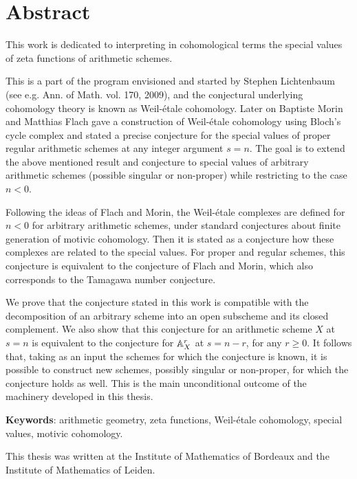 \chapter*{Abstract}

This work is dedicated to interpreting in cohomological terms the special values
of zeta functions of arithmetic schemes.

This is a part of the program envisioned and started by Stephen Lichtenbaum
(see e.g. Ann. of Math. vol. 170, 2009), and the conjectural underlying
cohomology theory is known as Weil-étale cohomology.  Later on Baptiste Morin
and Matthias Flach gave a construction of Weil-étale cohomology using Bloch's
cycle complex and stated a precise conjecture for the special values of proper
regular arithmetic schemes at any integer argument $s=n$. The goal is to extend
the above mentioned result and conjecture to special values of arbitrary
arithmetic schemes (possible singular or non-proper) while restricting to the
case $n<0$.

Following the ideas of Flach and Morin, the Weil-étale complexes are defined for
$n < 0$ for arbitrary arithmetic schemes, under standard conjectures about
finite generation of motivic cohomology. Then it is stated as a conjecture how
these complexes are related to the special values. For proper and regular
schemes, this conjecture is equivalent to the conjecture of Flach and Morin,
which also corresponds to the Tamagawa number conjecture.

We prove that the conjecture stated in this work is compatible with the
decomposition of an arbitrary scheme into an open subscheme and its closed
complement. We also show that this conjecture for an arithmetic scheme $X$ at
$s=n$ is equivalent to the conjecture for $\AA^r_X$ at $s=n-r$, for any
$r\geq 0$. It follows that, taking as an input the schemes for which the
conjecture is known, it is possible to construct new schemes, possibly singular
or non-proper, for which the conjecture holds as well. This is the main
unconditional outcome of the machinery developed in this thesis.

\ifdefined\dutch
\else
\vspace{1em}
\noindent\textbf{Keywords}: arithmetic geometry, zeta functions, Weil-étale
cohomology, special values, motivic cohomology.

This thesis was written at the Institute of Mathematics of Bordeaux and the
Institute of Mathematics of Leiden.
\fi
